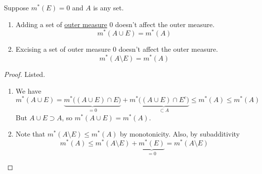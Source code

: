   \begin{lemma}
    \label{thm:sets-of-outer-measure-0-doesnt-affect-outer}
    Suppose $m^\ast (E) = 0$ and $A$ is any set. 
    \begin{enumerate}
      \item Adding a set of \hyperref[def:outer-measure]{outer measure} $0$ doesn't affect the outer measure. 
        \begin{equation}
          m^\ast (A \cup E) = m^\ast (A)
        \end{equation}
      \item Excising a set of outer measure $0$ doesn't affect the outer measure. 
        \begin{equation}
          m^\ast (A \setminus E) = m^\ast (A)
        \end{equation}
    \end{enumerate}
  \end{lemma}
  \begin{proof}
    Listed. 
    \begin{enumerate}
      \item We have 
        \begin{equation}
          m^\ast (A \cup E) = \underbrace{m^\ast \big( (A \cup E) \cap E \big)}_{=0} + m^\ast \underbrace{\big( (A \cup E) \cap E^c \big)}_{\subset A} \leq m^\ast (A) \leq m^\ast (A)
        \end{equation}
        But $A \cup E \supset A$, so $m^\ast (A \cup E) = m^\ast (A)$. 
      \item Note that $m^\ast (A \setminus E) \leq m^\ast (A)$ by monotonicity. Also, by subadditivity
        \begin{equation}
          m^\ast (A) \leq m^\ast (A \setminus E) + \underbrace{m^\ast (E)}_{=0} = m^\ast (A \setminus E)
        \end{equation}
    \end{enumerate}
  \end{proof} 

